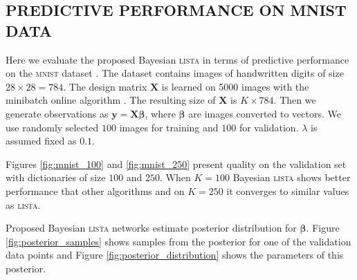 \documentclass[letterpaper]{article}
\begin{document}


\subsection{\uppercase{Predictive performance on mnist data}}
Here we evaluate the proposed Bayesian \textsc{lista} in terms of predictive performance on the \textsc{mnist} dataset \citep{lecun1998gradient}. The dataset contains images of handwritten digits of size $28 \times 28 = 784$. The design matrix $\mathbf{X}$ is learned on 5000 images with the minibatch online algorithm \citep{mairal2009online}. The resulting size of $\mathbf{X}$ is $K \times 784$. Then we generate observations as $\mathbf{y} = \mathbf{X}\boldsymbol\beta$, where $\boldsymbol\beta$ are images converted to vectors. We use randomly selected $100$ images for training and $100$ for validation. $\lambda$ is assumed fixed as $0.1$.

Figures \ref{fig:mnist_100} and \ref{fig:mnist_250} present quality on the validation set with dictionaries of size $100$ and $250$.  When $K=100$ Bayesian \textsc{lista} shows better performance that other algorithms and on $K=250$ it  converges to similar values as \textsc{lista}.

Proposed Bayesian \textsc{lista} networks estimate posterior distribution for $\boldsymbol\beta$. Figure \ref{fig:posterior_samples} shows samples from the posterior for one of the validation data points and Figure \ref{fig:posterior_distribution} shows the parameters of this posterior.
\end{document}
